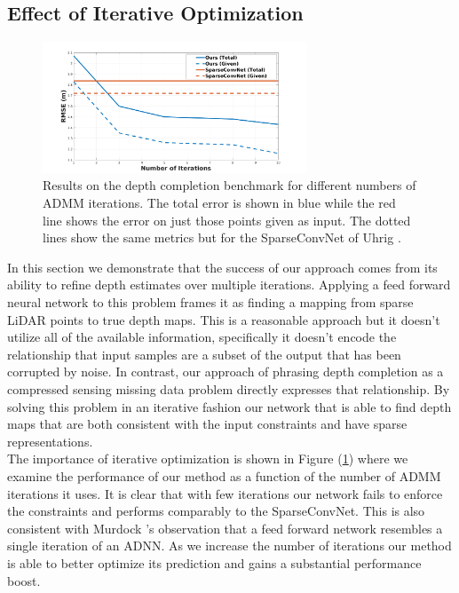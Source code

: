 \subsection{Effect of Iterative Optimization}
\label{sec:effect-iter-optim}
\begin{figure}
  \centering
  \includegraphics[width=0.7\textwidth]{iter_plot}
  \caption{Results on the depth completion benchmark for different numbers of ADMM iterations. The total error is shown in blue while the red line shows the error on just those points given as input. The dotted lines show the same metrics but for the SparseConvNet of Uhrig \etal\cite{uhrig}.}
  \label{fig:iterplot}
\end{figure}

In this section we demonstrate that the success of our approach comes from its ability to refine depth estimates over multiple iterations. Applying a feed forward neural network to this problem frames it as finding a mapping from sparse LiDAR points to true depth maps. This is a reasonable approach but it doesn't utilize all of the available information, specifically it doesn't encode the relationship that input samples are a subset of the output that has been corrupted by noise. In contrast, our approach of phrasing depth completion as a compressed sensing missing data problem directly expresses that relationship. By solving this problem in an iterative fashion our network that is able to find depth maps that are both consistent with the input constraints and have sparse representations.\\

The importance of iterative optimization is shown in Figure (\ref{fig:iterplot}) where we examine the performance of our method as a function of the number of ADMM iterations it uses. It is clear that with few iterations our network fails to enforce the constraints and performs comparably to the SparseConvNet.
This is also consistent with Murdock \etal's observation that a feed forward network resembles a single iteration of an ADNN. As we increase the number of iterations our method is able to better optimize its prediction and gains a substantial performance boost.



